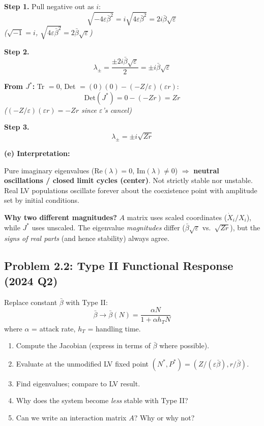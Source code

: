 \documentclass[10pt]{article}
\newcommand{\stepwhy}[1]{\textcolor{blue!60!black}{\small\textit{(#1)}}}
\begin{document}
\begin{solution}
\textbf{Step 1.} Pull negative out as $i$:
\[
\sqrt{-4\varepsilon\bar\beta^2} = i\sqrt{4\varepsilon\bar\beta^2} = 2i\bar\beta\sqrt\varepsilon
\]
\stepwhy{$\sqrt{-1} = i$, $\sqrt{4\varepsilon\bar\beta^2} = 2\bar\beta\sqrt\varepsilon$}

\textbf{Step 2.}
\[
\lambda_\pm = \frac{\pm 2i\bar\beta\sqrt\varepsilon}{2} = \pm i\bar\beta\sqrt\varepsilon
\]

\textbf{From $J^*$:} Tr $= 0$, Det $= (0)(0) - (-Z/\varepsilon)(\varepsilon r)$:
\[
\text{Det}(J^*) = 0 - (-Zr) = Zr
\]
\stepwhy{$(-Z/\varepsilon)(\varepsilon r) = -Zr$ since $\varepsilon$'s cancel}

\textbf{Step 3.}
\[
\lambda_\pm = \pm i\sqrt{Zr}
\]

\medskip\textbf{(e) Interpretation:}

Pure imaginary eigenvalues ($\text{Re}(\lambda) = 0$, $\text{Im}(\lambda) \neq 0$) $\Rightarrow$ \textbf{neutral oscillations / closed limit cycles (center)}. Not strictly stable nor unstable. Real LV populations oscillate forever about the coexistence point with amplitude set by initial conditions.

\textbf{Why two different magnitudes?} $A$ matrix uses scaled coordinates ($\dot X_i/X_i$), while $J^*$ uses unscaled. The eigenvalue \emph{magnitudes} differ ($\bar\beta\sqrt\varepsilon$ vs.\ $\sqrt{Zr}$), but the \emph{signs of real parts} (and hence stability) always agree.
\end{solution}

\subsection{Problem 2.2: Type II Functional Response (2024 Q2)}

\begin{problem}
Replace constant $\bar\beta$ with Type II:
\[
\bar\beta \to \bar\beta(N) = \frac{\alpha N}{1 + \alpha h_T N}
\]
where $\alpha$ = attack rate, $h_T$ = handling time.

\begin{enumerate}[label=(\alph*)]
\item Compute the Jacobian (express in terms of $\bar\beta$ where possible).
\item Evaluate at the unmodified LV fixed point $(N^*, P^*) = (Z/(\varepsilon\bar\beta), r/\bar\beta)$.
\item Find eigenvalues; compare to LV result.
\item Why does the system become \emph{less} stable with Type II?
\item Can we write an interaction matrix $A$? Why or why not?
\end{enumerate}
\end{problem}
\end{document}
